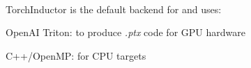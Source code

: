 \begin{defnbox}\nospacing
    \begin{defn}\label{defn:torchinductor}\leavevmode\\
        TorchInductor is the default backend for  and uses:
        \begin{itemizenosep}
            \item OpenAI Triton: to produce \textit{.ptx} code for GPU hardware
            \item C++/OpenMP: for CPU targets
        \end{itemizenosep}
    \end{defn}
\end{defnbox}
